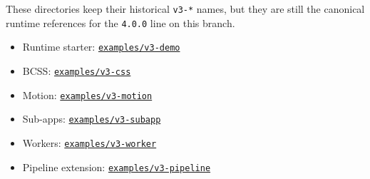 These directories keep their historical \texttt{v\allowbreak{}3\allowbreak{}-\allowbreak{}*} names, but they are still the canonical runtime references for the \texttt{4\allowbreak{}.\allowbreak{}0\allowbreak{}.\allowbreak{}0} line on this branch.

\begin{itemize}
\tightlist
\item
  Runtime starter: \href{https://github.com/flyingrobots/bijou/blob/cbd70612140e7a450d764b3c7be1c6af878b99bc/examples/v3-demo}{\texttt{e\allowbreak{}x\allowbreak{}a\allowbreak{}m\allowbreak{}p\allowbreak{}l\allowbreak{}e\allowbreak{}s\allowbreak{}/\allowbreak{}v\allowbreak{}3\allowbreak{}-\allowbreak{}d\allowbreak{}e\allowbreak{}m\allowbreak{}o}}
\item
  BCSS: \href{https://github.com/flyingrobots/bijou/blob/cbd70612140e7a450d764b3c7be1c6af878b99bc/examples/v3-css}{\texttt{e\allowbreak{}x\allowbreak{}a\allowbreak{}m\allowbreak{}p\allowbreak{}l\allowbreak{}e\allowbreak{}s\allowbreak{}/\allowbreak{}v\allowbreak{}3\allowbreak{}-\allowbreak{}c\allowbreak{}s\allowbreak{}s}}
\item
  Motion: \href{https://github.com/flyingrobots/bijou/blob/cbd70612140e7a450d764b3c7be1c6af878b99bc/examples/v3-motion}{\texttt{e\allowbreak{}x\allowbreak{}a\allowbreak{}m\allowbreak{}p\allowbreak{}l\allowbreak{}e\allowbreak{}s\allowbreak{}/\allowbreak{}v\allowbreak{}3\allowbreak{}-\allowbreak{}m\allowbreak{}o\allowbreak{}t\allowbreak{}i\allowbreak{}o\allowbreak{}n}}
\item
  Sub-apps: \href{https://github.com/flyingrobots/bijou/blob/cbd70612140e7a450d764b3c7be1c6af878b99bc/examples/v3-subapp}{\texttt{e\allowbreak{}x\allowbreak{}a\allowbreak{}m\allowbreak{}p\allowbreak{}l\allowbreak{}e\allowbreak{}s\allowbreak{}/\allowbreak{}v\allowbreak{}3\allowbreak{}-\allowbreak{}s\allowbreak{}u\allowbreak{}b\allowbreak{}a\allowbreak{}p\allowbreak{}p}}
\item
  Workers: \href{https://github.com/flyingrobots/bijou/blob/cbd70612140e7a450d764b3c7be1c6af878b99bc/examples/v3-worker}{\texttt{e\allowbreak{}x\allowbreak{}a\allowbreak{}m\allowbreak{}p\allowbreak{}l\allowbreak{}e\allowbreak{}s\allowbreak{}/\allowbreak{}v\allowbreak{}3\allowbreak{}-\allowbreak{}w\allowbreak{}o\allowbreak{}r\allowbreak{}k\allowbreak{}e\allowbreak{}r}}
\item
  Pipeline extension: \href{https://github.com/flyingrobots/bijou/blob/cbd70612140e7a450d764b3c7be1c6af878b99bc/examples/v3-pipeline}{\texttt{e\allowbreak{}x\allowbreak{}a\allowbreak{}m\allowbreak{}p\allowbreak{}l\allowbreak{}e\allowbreak{}s\allowbreak{}/\allowbreak{}v\allowbreak{}3\allowbreak{}-\allowbreak{}p\allowbreak{}i\allowbreak{}p\allowbreak{}e\allowbreak{}l\allowbreak{}i\allowbreak{}n\allowbreak{}e}}
\end{itemize}

